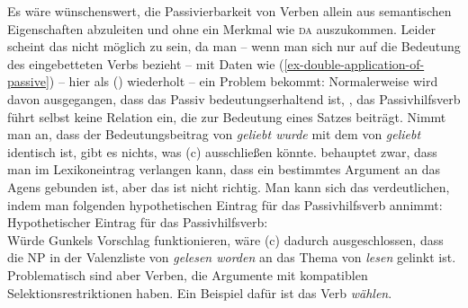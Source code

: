 {Es wäre wünschenswert, die Passivierbarkeit von Verben allein aus semantischen Eigenschaften abzuleiten
und ohne ein Merkmal wie \textsc{da} auszukommen. Leider scheint das nicht möglich zu sein, 
da man -- wenn man sich nur auf die Bedeutung des eingebetteten
Verbs bezieht -- mit Daten wie (\ref{ex-double-application-of-passive}) -- hier als () wiederholt --
ein Problem bekommt: Normalerweise wird davon ausgegangen, dass das Passiv bedeutungserhaltend ist, 
\dash, das Passivhilfsverb führt selbst keine Relation ein, die zur Bedeutung eines Satzes beiträgt. 
\eal
\label{ex-double-application-of-passive-zwei}
\zl
Nimmt man an, dass der Bedeutungsbeitrag von \emph{geliebt wurde} mit dem von \emph{geliebt} identisch ist,
gibt es nichts, was (c) ausschließen könnte. \citet[--101]{Gunkel2003b} behauptet zwar, 
dass man im Lexikoneintrag verlangen kann, dass ein bestimmtes Argument an das Agens gebunden ist, aber
das ist nicht richtig. Man kann sich das verdeutlichen, indem man folgenden hypothetischen
Eintrag für das Passivhilfsverb annimmt:
\eas
\label{le-passiv-gunkel}%
Hypothetischer Eintrag für das Passivhilfsverb:\\
\zs
Würde Gunkels Vorschlag funktionieren, wäre (c) dadurch ausgeschlossen,
dass die NP in der Valenzliste von \emph{gelesen worden} an das Thema von \emph{lesen}
gelinkt ist. Problematisch sind aber Verben, die Argumente mit kompatiblen
Selektionsrestriktionen haben. Ein Beispiel dafür ist das Verb \emph{wählen}.
}
